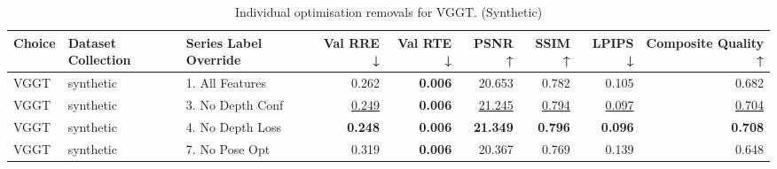 \begin{table}[H]
\caption{\ifdefined\customcaption \customcaption \else Individual optimisation removals for VGGT. (Synthetic) \fi}
\label{tab:99_all_improvements_removals_vggt_synthetic}
\centering
\scriptsize
\begin{tabular}{lllrrrrrr}
\toprule
Choice & Dataset Collection & Series Label Override & Val RRE ↓ & Val RTE ↓ & PSNR ↑ & SSIM ↑ & LPIPS ↓ & Composite Quality ↑ \\
\midrule
VGGT & synthetic & 1. All Features & 0.262 & \textbf{0.006} & 20.653 & 0.782 & 0.105 & 0.682 \\
VGGT & synthetic & 3. No Depth Conf & \underline{0.249} & \textbf{0.006} & \underline{21.245} & \underline{0.794} & \underline{0.097} & \underline{0.704} \\
VGGT & synthetic & 4. No Depth Loss & \textbf{0.248} & \textbf{0.006} & \textbf{21.349} & \textbf{0.796} & \textbf{0.096} & \textbf{0.708} \\
VGGT & synthetic & 7. No Pose Opt & 0.319 & \textbf{0.006} & 20.367 & 0.769 & 0.139 & 0.648 \\
\bottomrule
\end{tabular}
\end{table}